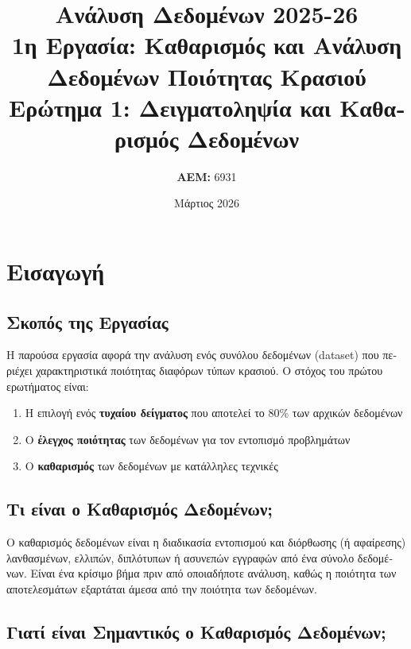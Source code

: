 \documentclass[12pt,a4paper]{article}
\title{
    \vspace{-1cm}
    \textbf{\textgreek{Ανάλυση Δεδομένων} 2025-26}\\
    \large \textgreek{1η Εργασία: Καθαρισμός και Ανάλυση Δεδομένων Ποιότητας Κρασιού}\\
    \vspace{0.5cm}
    \normalsize \textgreek{Ερώτημα 1: Δειγματοληψία και Καθαρισμός Δεδομένων}
}
\author{
    \textbf{AEM:} 6931
}
\date{\textgreek{Μάρτιος} 2026}
\begin{document}
\maketitle

\tableofcontents
\newpage

\section{\textgreek{Εισαγωγή}}

\subsection{\textgreek{Σκοπός της Εργασίας}}

\textgreek{Η παρούσα εργασία αφορά την ανάλυση ενός συνόλου δεδομένων (dataset) που περιέχει χαρακτηριστικά ποιότητας διαφόρων τύπων κρασιού. Ο στόχος του πρώτου ερωτήματος είναι:}

\begin{enumerate}
    \item \textgreek{Η επιλογή ενός} \textbf{\textgreek{τυχαίου δείγματος}} \textgreek{που αποτελεί το 80\% των αρχικών δεδομένων}
    \item \textgreek{Ο} \textbf{\textgreek{έλεγχος ποιότητας}} \textgreek{των δεδομένων για τον εντοπισμό προβλημάτων}
    \item \textgreek{Ο} \textbf{\textgreek{καθαρισμός}} \textgreek{των δεδομένων με κατάλληλες τεχνικές}
\end{enumerate}

\subsection{\textgreek{Τι είναι ο Καθαρισμός Δεδομένων;}}

\begin{infobox}
\textgreek{Ο καθαρισμός δεδομένων είναι η διαδικασία εντοπισμού και διόρθωσης (ή αφαίρεσης) λανθασμένων, ελλιπών, διπλότυπων ή ασυνεπών εγγραφών από ένα σύνολο δεδομένων. Είναι ένα κρίσιμο βήμα πριν από οποιαδήποτε ανάλυση, καθώς η ποιότητα των αποτελεσμάτων εξαρτάται άμεσα από την ποιότητα των δεδομένων.}
\end{infobox}

\subsection{\textgreek{Γιατί είναι Σημαντικός ο Καθαρισμός Δεδομένων;}}
\end{document}
